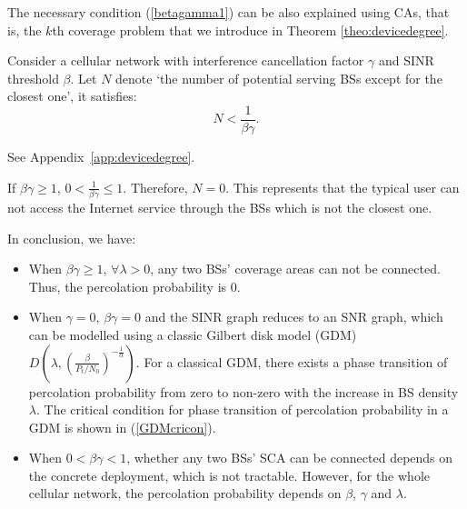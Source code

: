 \documentclass[final]{IEEEtran}
\begin{document}
The necessary condition (\ref{betagamma1}) can be also explained using CAs, that is, the $k$th coverage problem that we introduce in Theorem \ref{theo:devicedegree}.
\begin{theorem}
\label{theo:devicedegree}
    Consider a cellular network with interference cancellation factor $\gamma$ and SINR threshold $\beta$. Let $N$ denote `the number of potential serving BSs except for the closest one', it satisfies:
\begin{equation}
    N<\frac{1}{\beta\gamma}.
\end{equation}
\end{theorem}
\begin{IEEEproof}
    See Appendix~\ref{app:devicedegree}.
\end{IEEEproof}
\begin{remark}
    If $\beta\gamma\geq 1$, $0<\frac{1}{\beta\gamma}\leq 1$. Therefore, $N=0$. This represents that the typical user can not access the Internet service through the BSs which is not the closest one.
\end{remark}
In conclusion, we have:
\begin{itemize}
    \item When $\beta\gamma\geq 1$, $\forall \lambda>0$, any two BSs' coverage areas can not be connected. Thus, the percolation probability is 0.
    \item When $\gamma=0$, $\beta\gamma=0$ and the SINR graph reduces to an SNR graph, which can be modelled using a classic Gilbert disk model (GDM) $D(\lambda,(\frac{\beta}{P_t/N_0})^{-\frac{1}{\alpha}})$. For a classical GDM, there exists a phase transition of percolation probability from zero to non-zero with the increase in BS density $\lambda$. The critical condition for phase transition of percolation probability in a GDM is shown in (\ref{GDMcricon}).
    \item When $0<\beta\gamma<1$, whether any two BSs' SCA can be connected depends on the concrete deployment, which is not tractable. However, for the whole cellular network, the percolation probability depends on $\beta$, $\gamma$ and $\lambda$.
\end{itemize}
\end{document}
